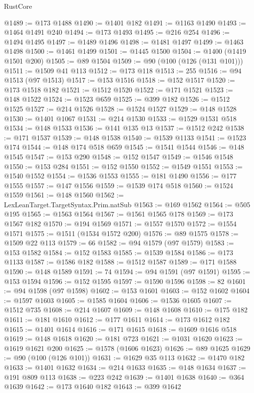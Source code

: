 \begin{lexlean}{RustCore}
\begin{coremodule}
@1489 := @173 @1488
@1490 := @1401 @182
@1491 := @1163 @1490
@1493 := @1464 @1491 @240
@1494 := @173 @1493
@1495 := @216 @254
@1496 := @1494 @1495
@1497 := @1489 @1496
@1498 := @1481 @1497
@1499 := @1463 @1498
@1500 := @1461 @1499
@1501 := @1445 @1500
@1504 := @1400 (@1419 @1501 @200)
@1505 := @89 @1504
@1509 := @90 (@100 (@126 (@131 @101)))
@1511 := @1509 @41 @113
@1512 := @173 @118
@1513 := 255
@1516 := @94 @1513 (@97 @1513)
@1517 := @153 @1516
@1518 := @152 @1517
@1520 := @173 @1518 @182
@1521 := @1512 @1520
@1522 := @171 @1521
@1523 := @148 @1522
@1524 := @1523 @659
@1525 := @399 @182
@1526 := @1512 @1525
@1527 := @214 @1526
@1528 := @1524 @1527
@1529 := @148 @1528
@1530 := @1401 @1067
@1531 := @214 @1530
@1533 := @1529 @1531 @518
@1534 := @148 @1533
@1536 := @141 @135 @13
@1537 := @1512 @242
@1538 := @171 @1537
@1539 := @148 @1538
@1540 := @1539 @1133
@1541 := @1523 @174
@1544 := @148 @174 @518 @659
@1545 := @1541 @1544
@1546 := @148 @1545
@1547 := @153 @290
@1548 := @152 @1547
@1549 := @1546 @1548
@1550 := @153 @284
@1551 := @152 @1550
@1552 := @1549 @1551
@1553 := @1540 @1552
@1554 := @1536 @1553
@1555 := @181 @1490
@1556 := @177 @1555
@1557 := @147 @1556
@1559 := @1539 @174 @518
@1560 := @1524 @1559
@1561 := @148 @1560
@1562 := LexLeanTarget.TargetSyntax.Prim.natSub
@1563 := @169 @1562
@1564 := @505 @195
@1565 := @1563 @1564
@1567 := @1561 @1565 @178
@1569 := @173 @1567 @182
@1570 := @194 @1569
@1571 := @1557 @1570
@1572 := @1554 @1571
@1575 := @1511 (@1534 @1572 @200)
@1576 := @89 @1575
@1578 := @1509 @22 @113
@1579 := 66
@1582 := @94 @1579 (@97 @1579)
@1583 := @153 @1582
@1584 := @152 @1583
@1585 := @1539 @1584
@1586 := @173 @1133
@1587 := @1586 @182
@1588 := @1512 @1587
@1589 := @171 @1588
@1590 := @148 @1589
@1591 := 74
@1594 := @94 @1591 (@97 @1591)
@1595 := @153 @1594
@1596 := @152 @1595
@1597 := @1590 @1596
@1598 := 82
@1601 := @94 @1598 (@97 @1598)
@1602 := @153 @1601
@1603 := @152 @1602
@1604 := @1597 @1603
@1605 := @1585 @1604
@1606 := @1536 @1605
@1607 := @1512 @735
@1608 := @214 @1607
@1609 := @148 @1608
@1610 := @175 @182
@1611 := @181 @1610
@1612 := @177 @1611
@1614 := @173 @1612 @182
@1615 := @1401 @1614
@1616 := @171 @1615
@1618 := @1609 @1616 @518
@1619 := @148 @1618
@1620 := @181 @723
@1621 := @1031 @1620
@1623 := @1619 @1621 @200
@1625 := @1578 (@1606 @1623)
@1626 := @89 @1625
@1629 := @90 (@100 (@126 @101))
@1631 := @1629 @35 @113
@1632 := @1470 @182
@1633 := @1401 @1632
@1634 := @214 @1633
@1635 := @148 @1634
@1637 := @191 @809 @113
@1638 := @223 @242
@1639 := @1401 @1638
@1640 := @364 @1639
@1642 := @173 @1640 @182
@1643 := @399 @1642

\end{coremodule}
\end{lexlean}
